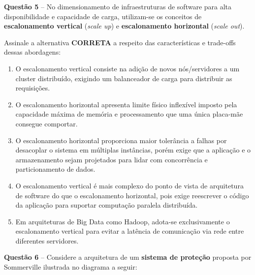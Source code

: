 \documentclass[12pt,a4paper]{article}
\begin{document}
\vspace{0.5cm}

\textbf{Questão 5} -- No dimensionamento de infraestruturas de software para alta disponibilidade e capacidade de carga, utilizam-se os conceitos de \textbf{escalonamento vertical} (\textit{scale up}) e \textbf{escalonamento horizontal} (\textit{scale out}).

\vspace{0.2cm}

Assinale a alternativa \textbf{CORRETA} a respeito das características e trade-offs dessas abordagens:

\vspace{0.3cm}

\begin{enumerate}[label=\textbf{(\Alph*)}]
    \item O escalonamento vertical consiste na adição de novos nós/servidores a um cluster distribuído, exigindo um balanceador de carga para distribuir as requisições.

    \item O escalonamento horizontal apresenta limite físico inflexível imposto pela capacidade máxima de memória e processamento que uma única placa-mãe consegue comportar.

    \item O escalonamento horizontal proporciona maior tolerância a falhas por desacoplar o sistema em múltiplas instâncias, porém exige que a aplicação e o armazenamento sejam projetados para lidar com concorrência e particionamento de dados.

    \item O escalonamento vertical é mais complexo do ponto de vista de arquitetura de software do que o escalonamento horizontal, pois exige reescrever o código da aplicação para suportar computação paralela distribuída.

    \item Em arquiteturas de Big Data como Hadoop, adota-se exclusivamente o escalonamento vertical para evitar a latência de comunicação via rede entre diferentes servidores.
\end{enumerate}

\vspace{0.5cm}

\textbf{Questão 6} -- Considere a arquitetura de um \textbf{sistema de proteção} proposta por Sommerville ilustrada no diagrama a seguir:
\end{document}

